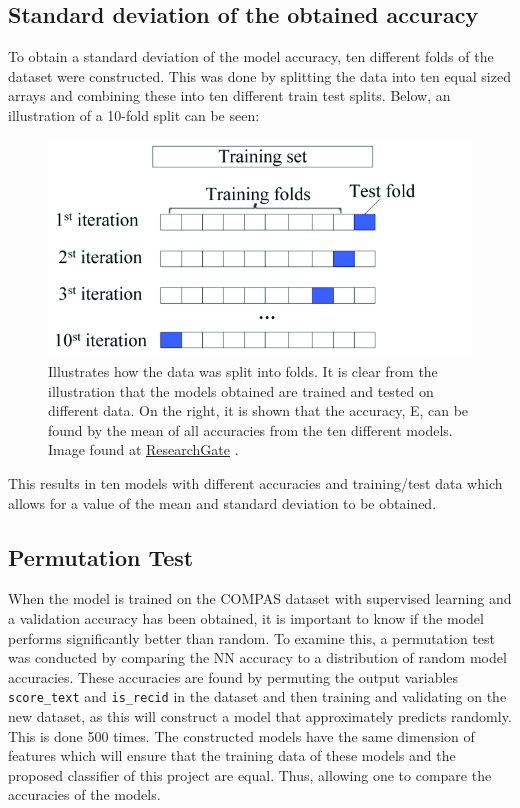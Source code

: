 \documentclass[11pt, fleqn, titlepage]{article}
\begin{document}
	\subsection{Standard deviation of the obtained accuracy} \label{standard_deviation}
	To obtain a standard deviation of the model accuracy, ten different folds of the dataset were constructed. This was done by splitting the data into ten equal sized arrays and combining these into ten different train test splits. Below, an illustration of a 10-fold split can be seen: 
	
	\begin{figure}[H]
		\centering
		\includegraphics[width=0.8\linewidth]{imgs/kfolds2}
		\caption{Illustrates how the data was split into folds. It is clear from the illustration that the models obtained are trained and tested on different data. On the right, it is shown that the accuracy, E, can be found by the mean of all accuracies from the ten different models. Image found at \href{https://www.researchgate.net/figure/Diagram-of-k-fold-cross-validation-with-k-10-Image-from-Karl-Rosaen-Log_fig1_332370436}{ResearchGate} \cite{researchgate}. }
		\label{fig:kfolds}
	\end{figure}
	\noindent
	This results in ten models with different accuracies and training/test data which allows for a value of the mean and standard deviation to be obtained.
	
	\subsection{Permutation Test}\label{permutation_test}

	When the model is trained on the COMPAS dataset with supervised learning and a validation accuracy has been obtained, it is important to know if the model performs significantly better than random. To examine this, a permutation test was conducted by comparing the NN accuracy to a distribution of random model accuracies. These accuracies are found by permuting the output variables \texttt{score\_text} and \texttt{is\_recid} in the dataset and then training and validating on the new dataset, as this will construct a model that approximately predicts randomly. This is done 500 times. The constructed models have the same dimension of features which will ensure that the training data of these models and the proposed classifier of this project are equal. Thus, allowing one to compare the accuracies of the models. 
	
\end{document}
